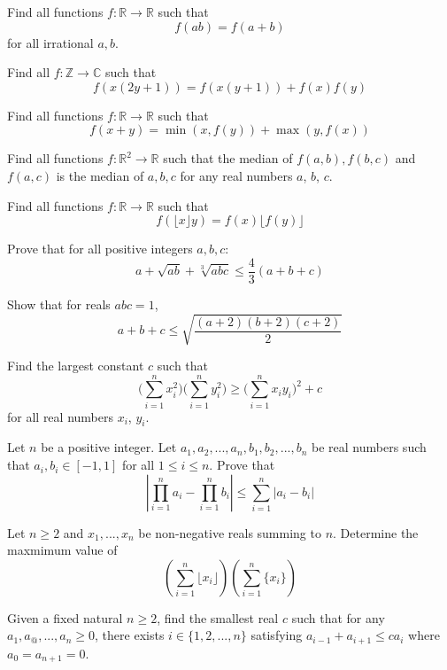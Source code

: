 


 {Find all functions $f: \mathbb{R} \rightarrow \mathbb{R}$ such that
    \[f(ab) = f(a+b)\]
for all irrational $a, b$.}

 {Find all $f:\mathbb{Z} \rightarrow\mathbb{C}$ such that $$f(x(2y+1))=f(x(y+1))+f(x)f(y)$$}



 {Find all functions $f: \mathbb{R}\rightarrow\mathbb{R}$ such that
\[f(x+y) = \min(x, f(y)) + \max(y, f(x))\]}

 {Find all functions $f: \mathbb{R}^2\rightarrow\mathbb{R}$ such that the median of $f(a,b), f(b,c)$ and $f(a,c)$ is the median of $a, b, c$ for any real numbers $a$, $b$, $c$.}

 {Find all functions $f: \mathbb{R}\rightarrow\mathbb{R}$ such that
\[f(\lfloor x \rfloor y) = f(x) \lfloor f(y) \rfloor\]}



 {Prove that for all positive integers $a, b, c$:
\[a + \sqrt{ab} + \sqrt[3]{abc} \le \frac43(a+b+c)\]}

 {Show that for reals $abc = 1$,
\[a + b + c \le \sqrt{\frac{(a+2)(b+2)(c+2)}{2}}\]}



 {Find the largest constant $c$ such that
\[\Big(\sum_{i=1}^nx_i^2\Big)\Big(\sum_{i=1}^ny_i^2\Big)\ge\Big(\sum_{i=1}^nx_iy_i\Big)^2+c\]
for all real numbers $x_i$, $y_i$.}

 {Let $n$ be a positive integer. Let $a_1, a_2, ..., a_n, b_1,b_2,...,b_n$ be real numbers such that $a_i,b_i\in [-1,1]$ for all $1\le i\le n$. Prove that $$\left\lvert \prod_{i=1}^n a_i - \prod_{i=1}^n b_i\right\rvert \le \sum_{i=1}^n |a_i-b_i|$$}

 {Let $n\ge 2$ and $x_1,...,x_n$ be non-negative reals summing to $n$. Determine the maxmimum value of $$\left(\sum_{i=1}^n \lfloor x_i \rfloor \right) \left(\sum_{i=1}^n \{x_i\} \right)$$}

 {Given a fixed natural $n\ge 2$, find the smallest real $c$ such that for any $a_1,a_@,...,a_n\ge 0$, there exists $i\in\{1,2,...,n\}$ satisfying $a_{i-1}+a_{i+1}\le ca_i$ where $a_0=a_{n+1}=0$.}

